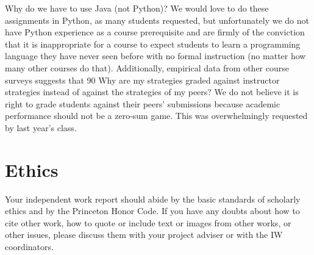 \documentclass[pageno]{jpaper}
\begin{document}
Why do we have to use Java (not Python)?
We would love to do these assignments in Python, as many students requested, but unfortunately we do not have Python experience as a course prerequisite and are firmly of the conviction that it is inappropriate for a course to expect students to learn a programming language they have never seen before with no formal instruction (no matter how many other courses do that).
Additionally, empirical data from other course surveys suggests that 90%
Why are my strategies graded against instructor strategies instead of against the strategies of my peers?
We do not believe it is right to grade students against their peers' submissions because academic performance should not be a zero-sum game. This was overwhelmingly requested by last year's class.


\section{Ethics}

Your independent work report should abide by the basic standards of scholarly ethics and by the Princeton Honor Code. If you have any doubts about how to cite
other work, how to quote or include text or images from other works, or other issues, please discuss them with your project adviser or with the IW coordinators. 





\end{document}

